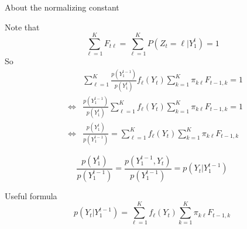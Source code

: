\documentclass[compress,10pt]{beamer}
\begin{document}
\begin{frame}[allowframebreaks]{About the normalizing constant}

Note that  $$\sum_{\ell=1}^K F_{t\ell} = \sum_{\ell=1}^K P(Z_t =\ell| Y_1^t)=1$$
So 
\begin{eqnarray*}
 &&\sum_{\ell=1}^K \frac{p(Y_1^{t-1})}{p(Y_1^t)} {f_{\ell}(Y_t)  \sum_{k=1}^K \pi_{k \ell} F_{t-1, k}} =1 \\
 &\Leftrightarrow& \frac{p(Y_1^{t-1})}{p(Y_1^t)}\sum_{\ell=1}^K{f_{\ell}(Y_t)  \sum_{k=1}^K \pi_{k \ell} F_{t-1, k}} =1\\
 &\Leftrightarrow&\frac{p(Y_1^{t})}{p(Y_1^{t-1})} =   \sum_{\ell=1}^K{f_{\ell}(Y_t)  \sum_{k=1}^K \pi_{k \ell} F_{t-1, k}}
 \end{eqnarray*}

$$ 
\frac{p(Y_1^{t})}{p(Y_1^{t-1})}  = \frac{p(Y_1^{t-1},Y_t)}{p(Y_1^{t-1})} = p(Y_t | Y_1^{t-1})$$
 
\begin{block}{Useful formula}
 \begin{equation}\label{HMM:eq lik}
p(Y_t | Y_1^{t-1}) =   \sum_{\ell=1}^K{f_{\ell}(Y_t)  \sum_{k=1}^K \pi_{k \ell} F_{t-1, k}}                                                         \end{equation}
\end{block}

\hyperlink{HMM: eq:marg like}{}

\end{frame}
\end{document}
